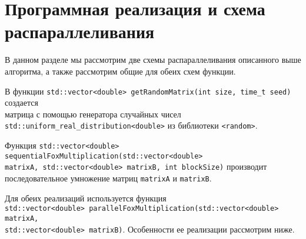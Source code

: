 \documentclass{article}
\begin{document}
\section*{Программная реализация и схема распараллеливания}
В данном разделе мы рассмотрим две схемы распараллеливания описанного выше алгоритма, а также рассмотрим общие для обеих схем функции.
\par
В функции \lstinline$std::vector<double> getRandomMatrix(int size, time_t seed)$ создается 
\\
матрица с помощью генератора случайных чисел
\\
\lstinline$std::uniform_real_distribution<double>$ из библиотеки \lstinline$<random>$. 
\par 
Функция \lstinline$std::vector<double> sequentialFoxMultiplication(std::vector<double> $
\\
\lstinline$matrixA, std::vector<double> matrixB, int blockSize)$ производит 
\\ 
последовательное умножение матриц \lstinline$matrixA$ и \lstinline$matrixB$. 
\par
Для обеих реализаций используется функция 
\\ 
\lstinline$std::vector<double> parallelFoxMultiplication(std::vector<double> matrixA,$
\\
\lstinline$std::vector<double> matrixB)$. Особенности ее реализации рассмотрим ниже.
\end{document}
